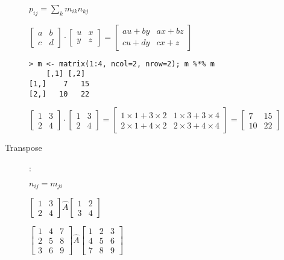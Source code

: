 \documentclass{article}
\begin{document}
\begin{description}
$p_{ij} = \sum_k m_{ik}n_{kj} $

$
\begin{bmatrix}
  a & b \\
  c & d
\end{bmatrix} \cdot
\begin{bmatrix}
  u & x \\
  y & z
\end{bmatrix}
=
\begin{bmatrix}
 au + by & ax + bz \\
 cu + dy & cx + z
\end{bmatrix}
$

\begin{verbatim}
> m <- matrix(1:4, ncol=2, nrow=2); m %*% m
    [,1] [,2]
[1,]    7   15
[2,]   10   22
\end{verbatim}



$
\begin{bmatrix}
  1 & 3 \\
  2 & 4
\end{bmatrix} \cdot
\begin{bmatrix}
  1 & 3 \\
  2 & 4
\end{bmatrix}
=
\begin{bmatrix}
 1 \times 1 + 3 \times 2 & 1 \times 3 + 3 \times 4 \\
 2 \times 1 + 4 \times 2 & 2 \times 3 + 4 \times 4
\end{bmatrix}
=
\begin{bmatrix}
7 & 15 \\
10 & 22
\end{bmatrix}
$

\item[Transpose] :

$n_{ij} = m_{ji}$

$
\begin{bmatrix}
  1 & 3 \\
  2 & 4
\end{bmatrix}
\widehat{ A}
\begin{bmatrix}
  1 & 2 \\
  3 & 4
\end{bmatrix}
$

$
\begin{bmatrix}
  1 & 4 & 7 \\
  2 & 5 & 8 \\
  3 & 6 & 9
\end{bmatrix}
\widehat{ A}
\begin{bmatrix}
  1 & 2 & 3 \\
  4 & 5 & 6 \\
  7 & 8 & 9
\end{bmatrix}
$
\end{description}
\end{document}
